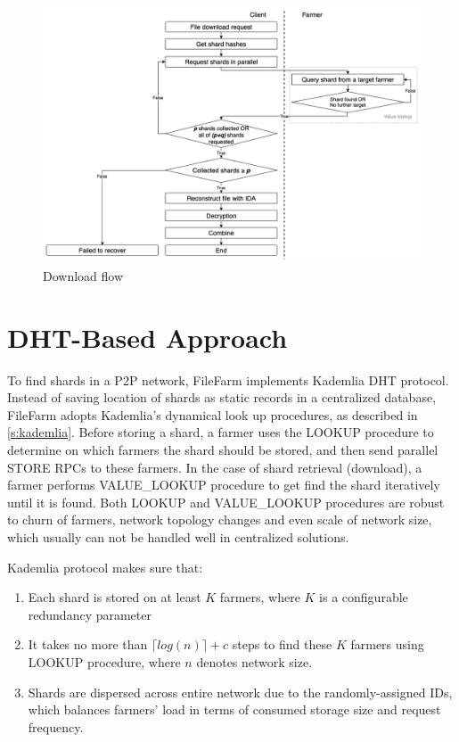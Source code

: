 \begin{figure}[hbt]
\centering
  \includegraphics[width=14cm]{figures/download_flow.png}
  \caption{Download flow}
  \label{fig:downloadflow}
\end{figure}

\newpage

\section{DHT-Based Approach}
\label{s:dhtbasedapproach}

To find shards in a P2P network, FileFarm implements Kademlia DHT protocol. Instead of saving location of shards as static records in a centralized database, FileFarm adopts Kademlia's dynamical look up procedures, as described in \ref{s:kademlia}. Before storing a shard, a farmer uses the LOOKUP procedure to determine on which farmers the shard should be stored, and then send parallel STORE RPCs to these farmers. In the case of shard retrieval (download), a farmer performs VALUE\_LOOKUP procedure to get find the shard iteratively until it is found. Both LOOKUP and VALUE\_LOOKUP procedures are robust to churn of farmers, network topology changes and even scale of network size, which usually can not be handled well in centralized solutions.

Kademlia protocol makes sure that:

\begin{enumerate}
  \item Each shard is stored on at least $K$ farmers, where $K$ is a configurable redundancy parameter
  \item It takes no more than $\lceil log(n) \rceil + c$ steps to find these $K$ farmers using LOOKUP procedure, where $n$ denotes network size.
  \item Shards are dispersed across entire network due to the randomly-assigned IDs, which balances farmers' load in terms of consumed storage size and request frequency.
\end{enumerate}

